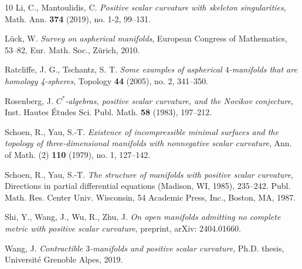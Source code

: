 \documentclass[11pt, reqno]{amsart}
\numberwithin{equation}{section}
\theoremstyle{definition}
\begin{document}
\begin{thebibliography}{10}
Li, C., Mantoulidis, C. {\em Positive scalar curvature with skeleton singularities}, Math. Ann. {\bf 374} (2019), no. 1-2, 99--131.

 L\"uck, W. {\em Survey on aspherical manifolds}, European Congress of Mathematics, 53--82, Eur. Math. Soc., Z\"{u}rich, 2010.

 Ratcliffe, J. G., Tschantz, S. T. {\em Some examples of aspherical $4$-manifolds that are homology 4-spheres}, Topology {\bf 44} (2005), no. 2, 341--350.

 Rosenberg, J. {\em $C^*$-algebras, positive scalar curvature, and the Novikov conjecture}, Inst. Hautes \'Etudes Sci. Publ. Math. {\bf 58} (1983), 197--212.

 Schoen, R., Yau, S.-T. {\em Existence of incompressible minimal surfaces and the topology of three-dimensional manifolds with nonnegative scalar curvature},
Ann. of Math. (2) {\bf 110} (1979), no. 1, 127--142.

 Schoen, R., Yau, S.-T. {\em The structure of manifolds with positive scalar curvature}, Directions in partial differential equations (Madison, WI, 1985), 235--242. Publ. Math. Res. Center Univ. Wisconsin, 54 Academic Press, Inc., Boston, MA, 1987.

 Shi, Y., Wang, J., Wu, R., Zhu, J. {\em On open manifolds admitting no complete metric with positive scalar curvature}, preprint, arXiv: 2404.01660.

 Wang, J. {\em Contractible $3$-manifolds and positive scalar curvature}, Ph.D. thesis, Universit\'e Grenoble Alpes, 2019.

\end{thebibliography}
\end{document}
